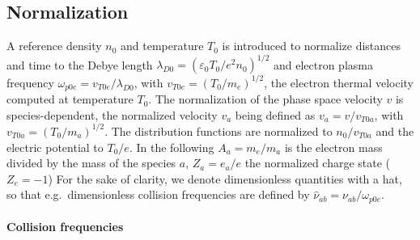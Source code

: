 \documentclass[11pt]{article}
\begin{document}
\subsection{Normalization}
A reference density $n_0$ and temperature $T_0$ is introduced to normalize distances and time to the Debye length $\lambda_{D0} = (\varepsilon_0T_0/e^2n_0)^{1/2}$ and electron plasma frequency $\omega_{p0e} = v_{T0e} / \lambda_{D0}$, with $v_{T0e} = (T_0/m_e)^{1/2}$, the electron thermal velocity computed at temperature $T_0$. The normalization of the phase space velocity $v$ is species-dependent, the normalized velocity $v_a$ being defined as $v_a = v/v_{T0a}$, with $v_{T0a} = (T_0/m_a)^{1/2}$. The distribution functions are normalized to $n_0/v_{T0a}$ and the electric potential to $T_0/e$.
In the following $A_a=m_e/m_a$ is the electron mass divided by the mass of the species $a$, $Z_a=e_a/e$ the normalized charge state ($Z_e=-1$) For the sake of clarity, we denote dimensionless quantities with a hat, so that e.g.\ dimensionless collision frequencies are defined by $\hat\nu_{ab} = \nu_{ab} / \omega_{p0e}$.


\paragraph{Collision frequencies}
\label{par:collision_frequencies}
\end{document}
